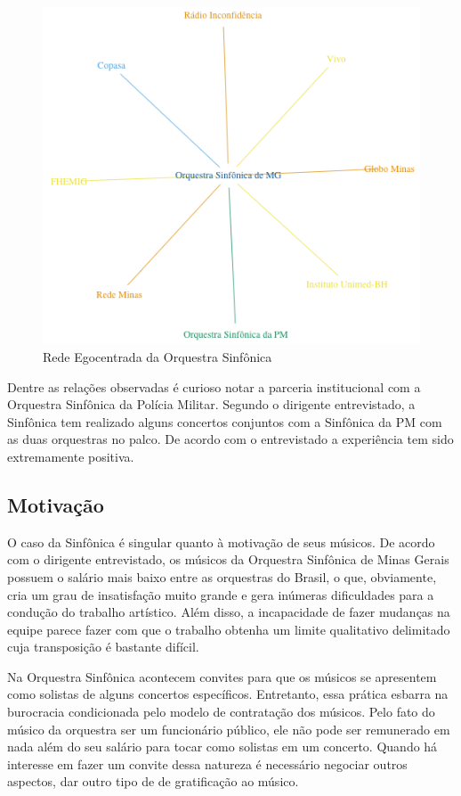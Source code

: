 \documentclass[a4paper, 12pt, openright, oneside, german, french, english, brazil]{abntex2}
\begin{document}
	\begin{figure}[!ht]
		\centering
		\caption{Rede Egocentrada da Orquestra Sinfônica}
		\label{rede-sinfonica}
		\includegraphics[scale=.7]{rede_sinfonica.png}
	\end{figure}

	Dentre as relações observadas é curioso notar a parceria institucional com a Orquestra Sinfônica da Polícia Militar. Segundo o dirigente entrevistado, a Sinfônica tem realizado alguns concertos conjuntos com a Sinfônica da PM com as duas orquestras no palco. De acordo com o entrevistado a experiência tem sido extremamente positiva.


	\subsection{Motivação}
	
	O caso da Sinfônica é singular quanto à motivação de seus músicos. De acordo com o dirigente entrevistado, os músicos da Orquestra Sinfônica de Minas Gerais possuem o salário mais baixo entre as orquestras do Brasil, o que, obviamente, cria um grau de insatisfação muito grande e gera inúmeras dificuldades para a condução do trabalho artístico. Além disso, a incapacidade de fazer mudanças na equipe parece fazer com que o trabalho obtenha um limite qualitativo delimitado cuja transposição é bastante difícil.
	
	Na Orquestra Sinfônica acontecem convites para que os músicos se apresentem como solistas de alguns concertos específicos. Entretanto, essa prática esbarra na burocracia condicionada pelo modelo de contratação dos músicos. Pelo fato do músico da orquestra ser um funcionário público, ele não pode ser remunerado em nada além do seu salário para tocar como solistas em um concerto. Quando há interesse em fazer um convite dessa natureza é necessário negociar outros aspectos, dar outro tipo de de gratificação ao músico.
	
\end{document}
